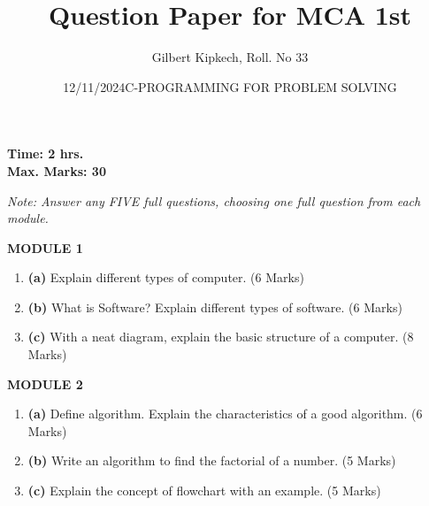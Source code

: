 \documentclass[12pt]{article}
\title{Question Paper for MCA 1st}
\author{Gilbert Kipkech, Roll. No 33}
\date{12/11/2024}
\date{C-PROGRAMMING FOR PROBLEM SOLVING}
\begin{document}
\maketitle

\textbf{Time: 2 hrs.} \\
\textbf{Max. Marks: 30}

\vspace{0.5cm}

\textit{Note: Answer any FIVE full questions, choosing one full question from each module.}

\vspace{1cm}

\textbf{MODULE 1}

\begin{enumerate}
    \item \textbf{(a)} Explain different types of computer. \hfill (6 Marks)
    \item \textbf{(b)} What is Software? Explain different types of software. \hfill (6 Marks)
    \item \textbf{(c)} With a neat diagram, explain the basic structure of a computer. \hfill (8 Marks)
\end{enumerate}

\vspace{1cm}

\textbf{MODULE 2}

\begin{enumerate}
    \item \textbf{(a)} Define algorithm. Explain the characteristics of a good algorithm. \hfill (6 Marks)
    \item \textbf{(b)} Write an algorithm to find the factorial of a number. \hfill (5 Marks)
    \item \textbf{(c)} Explain the concept of flowchart with an example. \hfill (5 Marks)
\end{enumerate}

\vspace{1cm}
\end{document}
